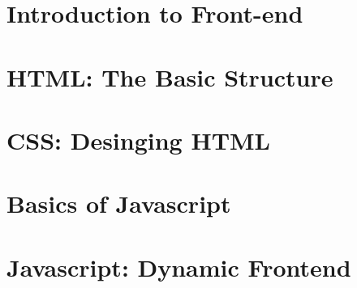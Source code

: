 \documentclass[a4paper,10pt,hidelinks]{book}
\begin{document}
    
    \dominitoc
    \tableofcontents

    \chapter{Introduction to Front-end}\label{ch:intoduction-to-front-end}
    \minitoc
    
    
    

    \chapter{HTML: The Basic Structure}\label{ch:html-the-basic-structure}
    \minitoc
    
    
    
    
    

    \chapter{CSS: Desinging HTML}\label{ch:css-designing-html}
    \minitoc
    
    
    
    
    
    
    

    \chapter{Basics of Javascript}\label{ch:basics-of-javascript}
    \minitoc
    
    
    
    
    
    

    \chapter{Javascript: Dynamic Frontend}\label{ch:javascript-dynamic-frontend}
    \minitoc
    
    
    
    
    
\end{document}
